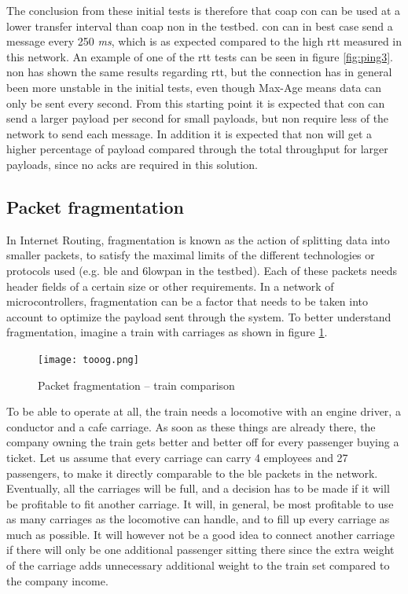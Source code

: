 \noindent The conclusion from these initial tests is therefore that \gls{coap} \gls{con} can be used at a lower transfer interval than \gls{coap} \gls{non} in the testbed. \gls{con} can in best case send a message every 250 \textit{ms}, which is as expected compared to the high \gls{rtt} measured in this network. An example of one of the \gls{rtt} tests can be seen in figure \ref{fig:ping3}. \gls{non} has shown the same results regarding \gls{rtt}, but the connection has in general been more unstable in the initial tests, even though Max-Age means data can only be sent every second. From this starting point it is expected that \gls{con} can send a larger \gls{payload} per second for small \glspl{payload}, but \gls{non} require less of the network to send each message. In addition it is expected that \gls{non} will get a higher percentage of \gls{payload} compared through the total throughput for larger \glspl{payload}, since no \glspl{ack} are required in this solution. 



\subsection{Packet fragmentation} \label{fragmentationSection}

\noindent In Internet Routing, fragmentation is known as the action of splitting data into smaller \glspl{packet}, to satisfy the maximal limits of the different technologies or protocols used (e.g. \gls{ble} and \gls{6lowpan} in the testbed). Each of these packets needs header fields of a certain size or other requirements. In a network of \glspl{microcontroller}, fragmentation can be a factor that needs to be taken into account to optimize the \gls{payload} sent through the system. To better understand fragmentation, imagine a train with carriages as shown in figure \ref{fig:trainExample}. 

\begin{figure}[ht]
    \centering
    \texttt{[image: tooog.png]}    
    \caption{Packet fragmentation -- train comparison}
    \label{fig:trainExample}
\end{figure}

\noindent To be able to operate at all, the train needs a locomotive with an engine driver, a conductor and a cafe carriage. As soon as these things are already there, the company owning the train gets better and better off for every passenger buying a ticket. Let us assume that every carriage can carry 4 employees and 27 passengers, to make it directly comparable to the \gls{ble} packets in the network. Eventually, all the carriages will be full, and a decision has to be made if it will be profitable to fit another carriage. It will, in general, be most profitable to use as many carriages as the locomotive can handle, and to fill up every carriage as much as possible. It will however not be a good idea to connect another carriage if there will only be one additional passenger sitting there since the extra weight of the carriage adds unnecessary additional weight to the train set compared to the company income. 

